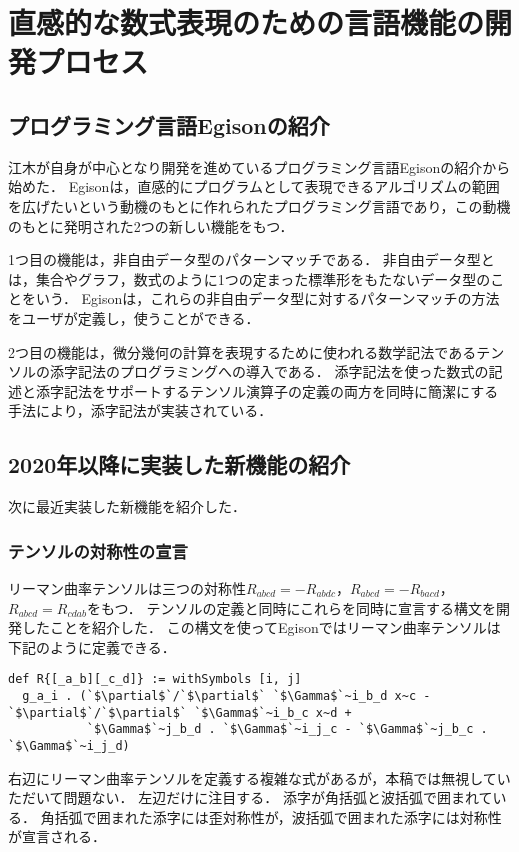 \documentclass[12pt]{article}
\begin{document}
\section*{直感的な数式表現のための言語機能の開発プロセス}
\subsection*{プログラミング言語Egisonの紹介}

江木が自身が中心となり開発を進めているプログラミング言語Egisonの紹介から始めた．
Egisonは，直感的にプログラムとして表現できるアルゴリズムの範囲を広げたいという動機のもとに作れられたプログラミング言語であり，この動機のもとに発明された2つの新しい機能をもつ．

1つ目の機能は，非自由データ型のパターンマッチである．
非自由データ型とは，集合やグラフ，数式のように1つの定まった標準形をもたないデータ型のことをいう．
Egisonは，これらの非自由データ型に対するパターンマッチの方法をユーザが定義し，使うことができる．

2つ目の機能は，微分幾何の計算を表現するために使われる数学記法であるテンソルの添字記法のプログラミングへの導入である．
添字記法を使った数式の記述と添字記法をサポートするテンソル演算子の定義の両方を同時に簡潔にする手法により，添字記法が実装されている．

\subsection*{2020年以降に実装した新機能の紹介}

次に最近実装した新機能を紹介した．

\subsubsection*{テンソルの対称性の宣言}

リーマン曲率テンソルは三つの対称性$R_{abcd} = -R_{abdc}$，$R_{abcd} = -R_{bacd}$，$R_{abcd} = R_{cdab}$をもつ．
テンソルの定義と同時にこれらを同時に宣言する構文を開発したことを紹介した．
この構文を使ってEgisonではリーマン曲率テンソルは下記のように定義できる．
\begin{lstlisting}[language=egison,numbers=none]
def R{[_a_b][_c_d]} := withSymbols [i, j]
  g_a_i . (`$\partial$`/`$\partial$` `$\Gamma$`~i_b_d x~c - `$\partial$`/`$\partial$` `$\Gamma$`~i_b_c x~d +
           `$\Gamma$`~j_b_d . `$\Gamma$`~i_j_c - `$\Gamma$`~j_b_c . `$\Gamma$`~i_j_d)
\end{lstlisting}
右辺にリーマン曲率テンソルを定義する複雑な式があるが，本稿では無視していただいて問題ない．
左辺だけに注目する．
添字が角括弧と波括弧で囲まれている．
角括弧で囲まれた添字には歪対称性が，波括弧で囲まれた添字には対称性が宣言される．
\end{document}
